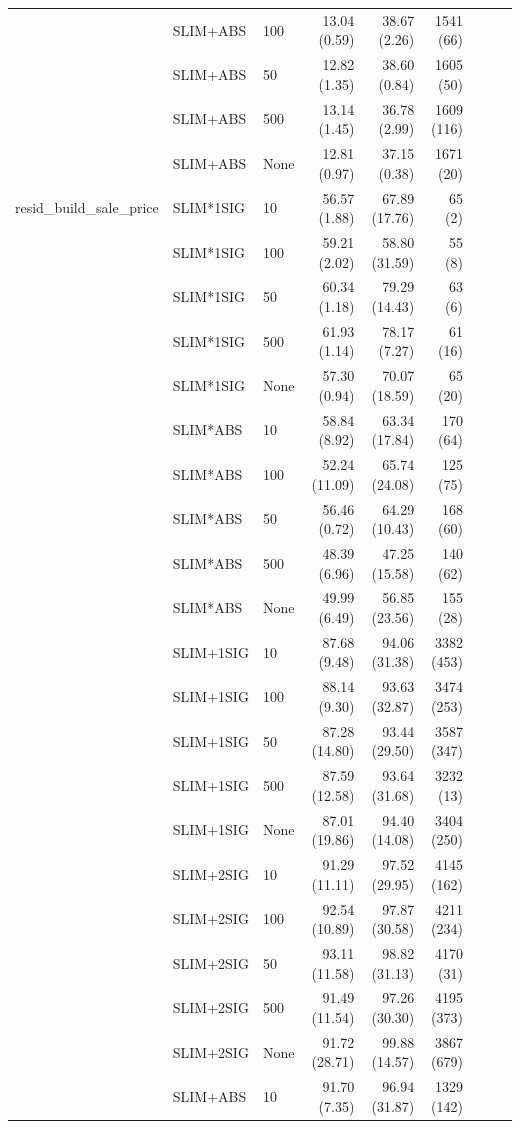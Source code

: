 \begin{longtable}{lllrrrrrr}
 & SLIM+ABS & 100 & 13.04 (0.59) & 38.67 (2.26) & 1541 (66) \\
 & SLIM+ABS & 50 & 12.82 (1.35) & 38.60 (0.84) & 1605 (50) \\
 & SLIM+ABS & 500 & 13.14 (1.45) & 36.78 (2.99) & 1609 (116) \\
 & SLIM+ABS & None & 12.81 (0.97) & 37.15 (0.38) & 1671 (20) \\
\midrule
resid_build_sale_price & SLIM*1SIG & 10 & 56.57 (1.88) & 67.89 (17.76) & 65 (2) \\
 & SLIM*1SIG & 100 & 59.21 (2.02) & 58.80 (31.59) & 55 (8) \\
 & SLIM*1SIG & 50 & 60.34 (1.18) & 79.29 (14.43) & 63 (6) \\
 & SLIM*1SIG & 500 & 61.93 (1.14) & 78.17 (7.27) & 61 (16) \\
 & SLIM*1SIG & None & 57.30 (0.94) & 70.07 (18.59) & 65 (20) \\
 & SLIM*ABS & 10 & 58.84 (8.92) & 63.34 (17.84) & 170 (64) \\
 & SLIM*ABS & 100 & 52.24 (11.09) & 65.74 (24.08) & 125 (75) \\
 & SLIM*ABS & 50 & 56.46 (0.72) & 64.29 (10.43) & 168 (60) \\
 & SLIM*ABS & 500 & 48.39 (6.96) & 47.25 (15.58) & 140 (62) \\
 & SLIM*ABS & None & 49.99 (6.49) & 56.85 (23.56) & 155 (28) \\
 & SLIM+1SIG & 10 & 87.68 (9.48) & 94.06 (31.38) & 3382 (453) \\
 & SLIM+1SIG & 100 & 88.14 (9.30) & 93.63 (32.87) & 3474 (253) \\
 & SLIM+1SIG & 50 & 87.28 (14.80) & 93.44 (29.50) & 3587 (347) \\
 & SLIM+1SIG & 500 & 87.59 (12.58) & 93.64 (31.68) & 3232 (13) \\
 & SLIM+1SIG & None & 87.01 (19.86) & 94.40 (14.08) & 3404 (250) \\
 & SLIM+2SIG & 10 & 91.29 (11.11) & 97.52 (29.95) & 4145 (162) \\
 & SLIM+2SIG & 100 & 92.54 (10.89) & 97.87 (30.58) & 4211 (234) \\
 & SLIM+2SIG & 50 & 93.11 (11.58) & 98.82 (31.13) & 4170 (31) \\
 & SLIM+2SIG & 500 & 91.49 (11.54) & 97.26 (30.30) & 4195 (373) \\
 & SLIM+2SIG & None & 91.72 (28.71) & 99.88 (14.57) & 3867 (679) \\
 & SLIM+ABS & 10 & 91.70 (7.35) & 96.94 (31.87) & 1329 (142) \\

\end{longtable}
